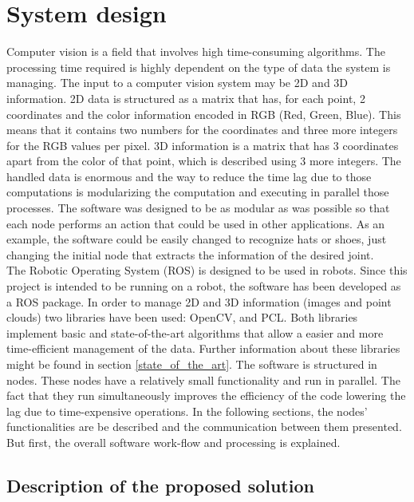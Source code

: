 \section{System design}
\label{system_design}
Computer vision is a field that involves high time-consuming algorithms. 
The processing time required is highly dependent on the type of data the system is managing. 
The input to a computer vision system may be 2D and 3D information. 
2D data is structured as a matrix that has, for each point, 2 coordinates and the color information encoded in RGB (Red, Green, Blue).
This means that it contains two numbers for the coordinates and three more integers for the RGB values per pixel. 
3D information is a matrix that has 3 coordinates apart from the color of that point, which is described using 3 more integers. 
The handled data is enormous and the way to reduce the time lag due to those computations is modularizing the computation and executing in parallel those processes. 
The software was designed to be as modular as was possible so that each node performs an action that could be used in other applications. 
As an example, the software could be easily changed to recognize hats or shoes, just changing the initial node that extracts the information of the desired joint. 
\\

The Robotic Operating System (ROS) is designed to be used in robots. 
Since this project is intended to be running on a robot, the software has been developed as a ROS package. 
In order to manage 2D and 3D information (images and point clouds) two libraries have been used: OpenCV, and PCL. 
Both libraries implement basic and state-of-the-art algorithms that allow a easier and more time-efficient management of the data. Further information about these libraries might be found in section \ref{state_of_the_art}. 
The software is structured in nodes. 
These nodes have a relatively small functionality and run in parallel. 
The fact that they run simultaneously improves the efficiency of the code lowering the lag due to time-expensive operations. 
In the following sections, the nodes' functionalities are be described and the communication between them presented. 
But first, the overall software work-flow and processing is explained. 


\subsection{Description of the proposed solution}

